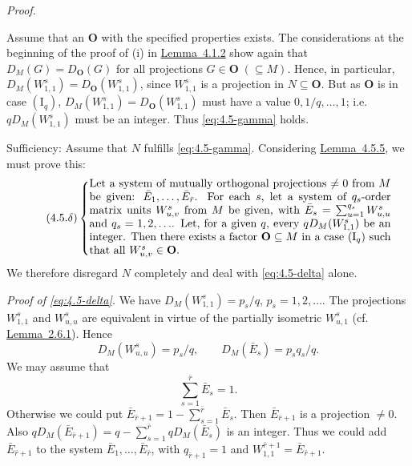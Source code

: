 \documentclass[b5paper,twoside]{article}
\newcommand{\lemref}[2]{\hyperref[#1]{\mbox{Lemma~#2}}}
\theoremstyle{mvnplain}
\renewenvironment{proof}[1][Proof]{%
  \par\addvspace{0.35\baselineskip}%
  \noindent\textit{#1.}\ \normalfont\ignorespaces
}{%
  \par\addvspace{0.35\baselineskip}%
}
\newcommand{\M}{\mathbf M}
\newcommand{\N}{\mathbf N}
\def\M{M}%
\def\N{N}%
\begin{document}
\begin{proof}
Assume that an \(\mathbf O\) with the specified properties exists. The
considerations at the beginning of the proof of (i) in
\lemref{lem:4.1.2}{4.1.2} show again that
\(D_{\M}(G)=D_{\mathbf O}(G)\) for all projections
\(G\in\mathbf O\;(\subseteq\M)\). Hence, in particular,
\(D_{\M}(W^s_{1,1})=D_{\mathbf O}(W^s_{1,1})\), since \(W^s_{1,1}\) is a
projection in \(\N\subseteq\mathbf O\). But as \(\mathbf O\) is in case
\((\mathrm I_q)\), \(D_{\M}(W^s_{1,1})=D_{\mathbf O}(W^s_{1,1})\) must have
a value \(0,1/q,\ldots,1\); i.e. \(qD_{\M}(W^s_{1,1})\) must be an integer.
Thus \eqref{eq:4.5-gamma} holds.

Sufficiency: Assume that \(\N\) fulfills \eqref{eq:4.5-gamma}. Considering
\lemref{lem:4.5.5}{4.5.5}, we must prove this:
\begin{equation}\tag{4.5.\(\delta\)}\label{eq:4.5-delta}
\left\{\begin{minipage}{0.78\linewidth}
Let a system of mutually orthogonal projections \(\ne0\) from \(\M\) be given:
\(\bar E_1,\ldots,\bar E_{\bar r}\). For each \(s\), let a system of
\(q_s\)-order matrix units \(W^s_{u,v}\) from \(\M\) be given, with
\(\bar E_s=\sum_{u=1}^{q_s}W^s_{u,u}\) and \(q_s=1,2,\ldots\). Let, for a
given \(q\), every \(qD_{\M}(W^s_{1,1})\) be an integer. Then there exists a
factor \(\mathbf O\subseteq\M\) in a case \((\mathrm I_q)\) such that all
\(W^s_{u,v}\in\mathbf O\).
\end{minipage}\right.
\end{equation}
We therefore disregard \(\N\) completely and deal with
\eqref{eq:4.5-delta} alone.

\textit{Proof of \eqref{eq:4.5-delta}.} We have
\(D_{\M}(W^s_{1,1})=p_s/q\), \(p_s=1,2,\ldots\). The projections
\(W^s_{1,1}\) and \(W^s_{u,u}\) are equivalent in virtue of the partially
isometric \(W^s_{u,1}\) (cf. \lemref{lem:2.6.1}{2.6.1}). Hence
\begin{equation}\tag{4.5.\(\epsilon\)}\label{eq:4.5-epsilon}
 D_{\M}(W^s_{u,u})=p_s/q,\qquad
 D_{\M}(\bar E_s)=p_sq_s/q.
\end{equation}
We may assume that
\begin{equation}\tag{4.5.\(\zeta\)}\label{eq:4.5-zeta}
 \sum_{s=1}^{\bar r}\bar E_s=1.
\end{equation}
Otherwise we could put \(\bar E_{\bar r+1}=1-\sum_{s=1}^{\bar r}\bar E_s\).
Then \(\bar E_{\bar r+1}\) is a projection \(\ne0\). Also
\(qD_{\M}(\bar E_{\bar r+1})=q-
\sum_{s=1}^{\bar r}qD_{\M}(\bar E_s)\) is an integer. Thus we could add
\(\bar E_{\bar r+1}\) to the system \(\bar E_1,\ldots,\bar E_{\bar r}\),
with \(q_{\bar r+1}=1\) and
\(W^{\bar r+1}_{1,1}=\bar E_{\bar r+1}\).


\end{proof}
\end{document}
